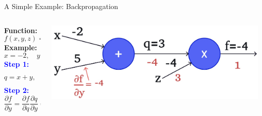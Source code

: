 \documentclass[serif, aspectratio=169]{beamer}
\begin{document}
\begin{frame}{A Simple Example: Backpropagation}

    \begin{columns}
       
        \begin{column}{0.3\textwidth}
            \vspace{-0.4cm}
            \textbf{Function:} 
            \[
            f(x, y, z) = (x + y)z
            \]
            \textbf{Example:} 
            \[
            x = -2, \quad y = 5, \quad z = -4
            \]
            \vspace{-0.4cm}
            \textcolor{blue}{\textbf{Step 1:}}
            \[
             q = x + y, \quad
            \frac{\partial q}{\partial x} = 1, \quad \frac{\partial q}{\partial y} = 1
            \]
            \vspace{-0.2cm}
            \textcolor{blue}{\textbf{Step 2:}}
            \[
            \frac{\partial f}{\partial y} =  \frac{\partial f}{\partial q}
            \frac{\partial q}{\partial y} = -4 \cdot 1 = -4
            \]
        \end{column}

        \begin{column}{0.7\textwidth}
                    \begin{center}
                \includegraphics[width=\textwidth, keepaspectratio]{pic/b6.jpg}
            \end{center}
        \end{column}

    \end{columns}

\end{frame}
\end{document}
